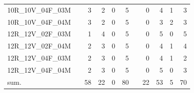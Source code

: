 \begin{tabular}{llrrrrlrrrr}
10R\_10V\_04F\_03M & \hspace{0.1cm} & 3 & 2 & 0 & 5 & \hspace{0.2cm} & 0 & 4 & 1 & 3\\
10R\_10V\_04F\_04M & \hspace{0.1cm} & 3 & 2 & 0 & 5 & \hspace{0.2cm} & 0 & 3 & 2 & 3\\
\addlinespace
12R\_12V\_02F\_03M & \hspace{0.1cm} & 1 & 4 & 0 & 5 & \hspace{0.2cm} & 0 & 5 & 0 & 5\\
12R\_12V\_02F\_04M & \hspace{0.1cm} & 2 & 3 & 0 & 5 & \hspace{0.2cm} & 0 & 4 & 1 & 4\\
12R\_12V\_04F\_03M & \hspace{0.1cm} & 2 & 3 & 0 & 5 & \hspace{0.2cm} & 0 & 4 & 1 & 2\\
12R\_12V\_04F\_04M & \hspace{0.1cm} & 2 & 3 & 0 & 5 & \hspace{0.2cm} & 0 & 5 & 0 & 3\\
\addlinespace
sum. & \hspace{0.1cm} & 58 & 22 & 0 & 80 & \hspace{0.2cm} & 22 & 53 & 5 & 70\\
\bottomrule
\end{tabular}
